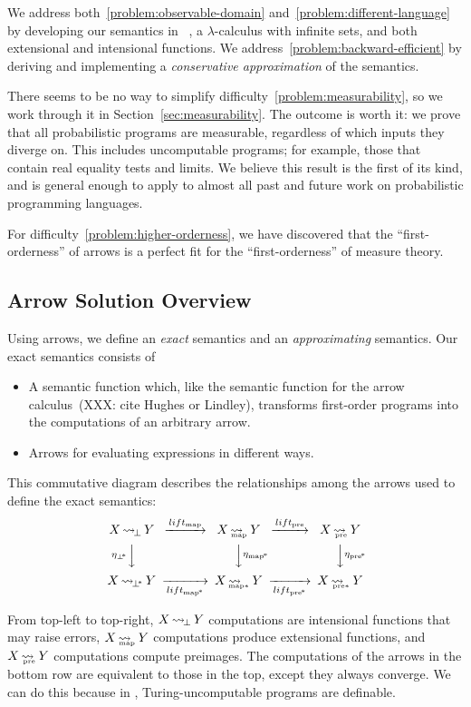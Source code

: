 \documentclass[preprint]{sigplanconf}
\newcommand{\arrow}{\rightsquigarrow}
\newcommand{\arrowlift}{\ensuremath{lift}}
\DeclareMathOperator{\botto}{\arrow_{\mspace{-3mu}\bot}}
\newcommand{\map}{_\mathrm{map}}
\DeclareMathOperator{\mapto}{\arrow_{\mspace{-21mu}\map}}
\newcommand{\liftmap}{\arrowlift\map}
\newcommand{\pre}{_\mathrm{pre}}
\DeclareMathOperator{\preto}{\arrow_{\mspace{-19mu}\pre}}
\newcommand{\liftpre}{\arrowlift\pre}
\newcommand{\pbot}{{\bot^{\mspace{-4mu}*}}}
\DeclareMathOperator{\pbotto}{\arrow_{\mspace{-3mu}\pbot}}
\newcommand{\pmap}{_\mathrm{map^{\mspace{-2mu}*}}}
\DeclareMathOperator{\pmapto}{\arrow_{\mspace{-22mu}_{\mathrm{map*}}}}
\newcommand{\liftpmap}{\arrowlift\pmap}
\newcommand{\ppre}{_\mathrm{pre^{\mspace{-2mu}*}}}
\DeclareMathOperator{\ppreto}{\arrow_{\mspace{-19mu}_{\mathrm{pre*}}}}
\newcommand{\liftppre}{\arrowlift\ppre}
\begin{document}
We address both~\ref{problem:observable-domain} and~\ref{problem:different-language} by developing our semantics in \lzfclang~\cite{cit:toronto-2012flops-lzfc}, a $\lambda$-calculus with infinite sets, and both extensional and intensional functions.
We address~\ref{problem:backward-efficient} by deriving and implementing a \emph{conservative approximation} of the semantics.

There seems to be no way to simplify difficulty~\ref{problem:measurability}, so we work through it in Section~\ref{sec:measurability}.
The outcome is worth it: we prove that all probabilistic programs are measurable, regardless of which inputs they diverge on.
This includes uncomputable programs; for example, those that contain real equality tests and limits.
We believe this result is the first of its kind, and is general enough to apply to almost all past and future work on probabilistic programming languages.

For difficulty~\ref{problem:higher-orderness}, we have discovered that the ``first-orderness'' of arrows is a perfect fit for the ``first-orderness'' of measure theory.

\subsection{Arrow Solution Overview}

\newcommand{\youarehere}[1]%
{%
\begin{equation}%
\begin{CD}%
X \botto Y   @>\liftmap>>   X \mapto Y   @>\liftpre>>   X \preto Y \\%
@V{\eta_\pbot}VV             @VV{\eta\pmap}V              @VV{\eta\ppre}V\\%
X \pbotto Y  @>>\liftpmap>  X \pmapto Y  @>>\liftppre>  X \ppreto Y%
\end{CD}%
\label{#1}%
\end{equation}%
}

Using arrows, we define an \emph{exact} semantics and an \emph{approximating} semantics.
Our exact semantics consists of
\begin{itemize}
	\item A semantic function which, like the semantic function for the arrow calculus~(XXX: cite Hughes or Lindley), transforms first-order programs into the computations of an arbitrary arrow.
	\item Arrows for evaluating expressions in different ways.
\end{itemize}
This commutative diagram describes the relationships among the arrows used to define the exact semantics:
\youarehere{eqn:roadmap-diagram1}
From top-left to top-right, $X \botto Y$ computations are intensional functions that may raise errors, $X \mapto Y$ computations produce extensional functions, and $X \preto Y$ computations compute preimages.
The computations of the arrows in the bottom row are equivalent to those in the top, except they always converge.
We can do this because in \lzfclang, Turing-uncomputable programs are definable.
\end{document}

